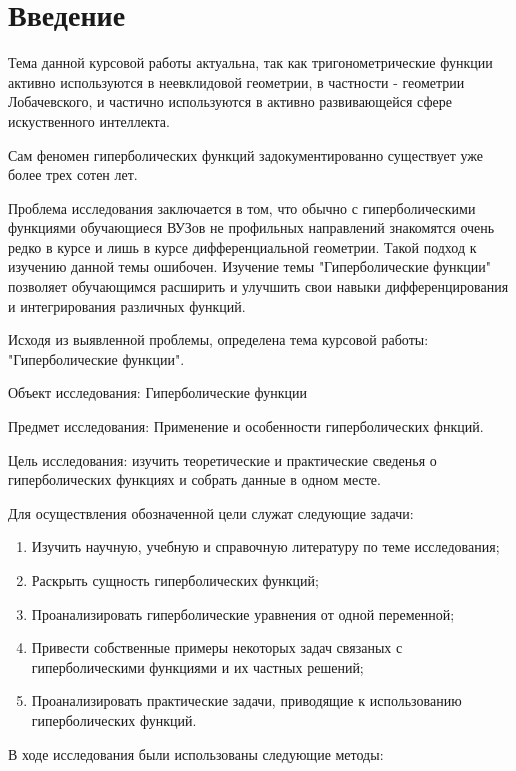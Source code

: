 \section*{Введение}

Тема данной курсовой работы актуальна, так как тригонометрические функции активно используются в неевклидовой геометрии, в частности - геометрии Лобачевского, и частично используются в активно развивающейся сфере искуственного интеллекта.

Сам феномен гиперболических функций задокументированно существует уже более трех сотен лет.

Проблема исследования заключается в том, что обычно с гиперболическими функциями обучающиеся ВУЗов не профильных направлений знакомятся очень редко в курсе и лишь в курсе дифференциальной геометрии. Такой подход к изучению данной темы ошибочен. Изучение темы "Гиперболические функции" позволяет обучающимся расширить и улучшить свои навыки дифференцирования и интегрирования различных функций.

Исходя из выявленной проблемы, определена тема курсовой работы: "Гиперболические функции".

Объект исследования: Гиперболические функции

Предмет исследования: Применение и особенности гиперболических фнкций.

Цель исследования: изучить теоретические и практические сведенья о гиперболических функциях и собрать данные в одном месте.

Для осуществления обозначенной цели служат следующие задачи:

    \begin{enumerate}
        \item Изучить научную, учебную и справочную литературу по теме исследования;
        \item Раскрыть сущность гиперболических функций;
        \item Проанализировать гиперболические уравнения от одной переменной;
        \item Привести собственные примеры некоторых задач связаных с гиперболическими функциями и их частных решений;
        \item Проанализировать практические задачи, приводящие к использованию гиперболических функций.
    \end{enumerate}

В ходе исследования были использованы следующие методы:

